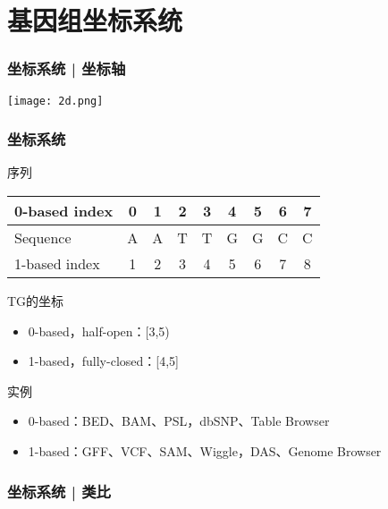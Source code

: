 \section{基因组坐标系统}
\begin{frame}
	\frametitle{坐标系统 | 坐标轴}
	\begin{center}
		\texttt{[image: 2d.png]}
	\end{center}
\end{frame}

\begin{frame}
	\frametitle{坐标系统}
	\begin{block}{序列}
	\begin{table}
		\centering
		\begin{tabular}{lcccccccc}
			\hline
			0-based index & 0 & 1 & 2 & 3 & 4 & 5 & 6 & 7\\
			\hline
			Sequence & A & A & T & T & G & G & C & C\\
			\hline
			1-based index & 1 & 2 & 3 & 4 & 5 & 6 & 7 & 8\\
			\hline
		\end{tabular}
	\end{table}
	\end{block}
	\pause
	\begin{block}{TG的坐标}
		\begin{itemize}
			\item 0-based，half-open：[3,5)
			\item 1-based，fully-closed：[4,5]
		\end{itemize}
	\end{block}
	\pause
	\begin{block}{实例}
		\begin{itemize}
			\item 0-based：BED、BAM、PSL，dbSNP、Table Browser
			\item 1-based：GFF、VCF、SAM、Wiggle，DAS、Genome Browser
		\end{itemize}
	\end{block}
\end{frame}

\begin{frame}
	\frametitle{坐标系统 | 类比}
	\begin{columns}
	\end{columns}
\end{frame}

